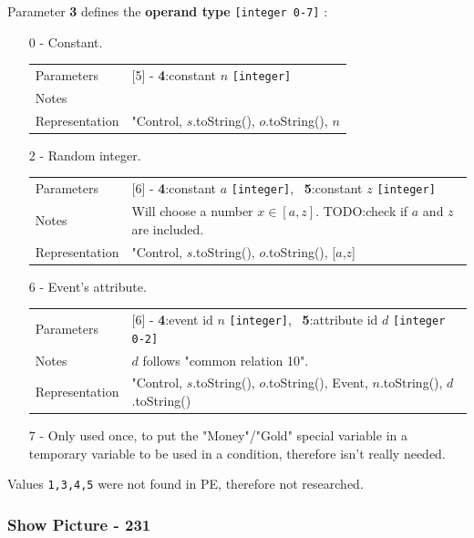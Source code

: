 \documentclass[11pt]{article}
\begin{document}
{Parameter \textbf{3} defines the \textbf{operand type} \verb|[integer 0-7]| :
\begin{itemize}
	
	\item[0] - Constant.
	
	\begin{tabular}{|a l|}
		\hline
		Parameters & [5] - \textbf{4}:constant $n$ \verb|[integer]| \\
		Notes &  \\
		Representation & "Control, $s$.toString(), $o$.toString(), $n$ \\
		\hline
	\end{tabular}
	
	\item[2] - Random integer.
	
	\begin{tabular}{|a l|}
		\hline
		Parameters & [6] - \textbf{4}:constant $a$ \verb|[integer]|, \ \textbf{5}:constant $z$ \verb|[integer]| \\
		Notes & Will choose a number $x \in [a,z]$. TODO:check if $a$ and $z$ are included. \\
		Representation & "Control, $s$.toString(), $o$.toString(), [$a$,$z$] \\
		\hline
	\end{tabular}
	
	\item[6] - Event's attribute.
	
	\begin{tabular}{|a l|}
		\hline
		Parameters & [6] - \textbf{4}:event id $n$ \verb|[integer]|, \ \textbf{5}:attribute id $d$ \verb|[integer 0-2]| \\
		Notes & $d$ follows "common relation 10". \\
		Representation & "Control, $s$.toString(), $o$.toString(), Event, $n$.toString(), $d$.toString() \\
		\hline
	\end{tabular}
	
	\item[7] - Only used once, to put the "Money"/"Gold" special variable in a temporary variable to be used in a condition, therefore isn't really needed.
	
\end{itemize}

Values \verb|1,3,4,5| were not found in PE, therefore not researched.


\subsubsection*{Show Picture - 231}
\label{sec:showpicture}

}
\end{document}
